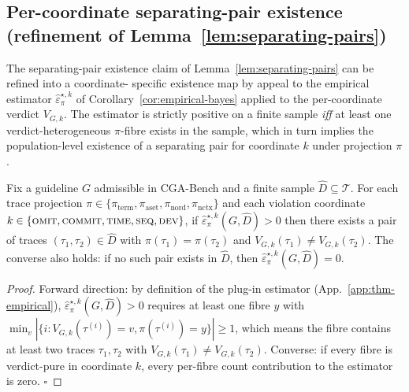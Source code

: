
\subsection{Per-coordinate separating-pair existence (refinement of Lemma~\ref{lem:separating-pairs})}
\label{app:per-type-existence}

The separating-pair existence claim of
Lemma~\ref{lem:separating-pairs} can be refined into a coordinate-
specific existence map by appeal to the empirical estimator
$\widehat{\varepsilon}^{\star,k}_{\pi}$ of
Corollary~\ref{cor:empirical-bayes} applied to the per-coordinate
verdict $V_{G,k}$. The estimator is strictly positive on a finite
sample \emph{iff} at least one verdict-heterogeneous $\pi$-fibre
exists in the sample, which in turn implies the population-level
existence of a separating pair for coordinate $k$ under projection $\pi$.

\begin{lemma}
\label{lem:per-type-existence}
Fix a guideline $G$ admissible in CGA-Bench and a finite sample
$\widehat{D}\subseteq\mathcal{T}$. For each trace projection
$\pi\in\{\pi_{\mathrm{term}},\pi_{\mathrm{aset}},\pi_{\mathrm{nord}},\pi_{\mathrm{nctx}}\}$
and each violation coordinate
$k\in\{\textsc{omit},\textsc{commit},\textsc{time},\textsc{seq},\textsc{dev}\}$,
if $\widehat{\varepsilon}^{\star,k}_{\pi}(G,\widehat{D})>0$ then there
exists a pair of traces $(\tau_1,\tau_2)\in\widehat{D}$ with
$\pi(\tau_1)=\pi(\tau_2)$ and
$V_{G,k}(\tau_1)\neq V_{G,k}(\tau_2)$.
The converse also holds: if no such pair exists in $\widehat{D}$, then
$\widehat{\varepsilon}^{\star,k}_{\pi}(G,\widehat{D})=0$.
\end{lemma}

\begin{proof}
Forward direction: by definition of the plug-in estimator
(App.~\ref{app:thm-empirical}),
$\widehat{\varepsilon}^{\star,k}_{\pi}(G,\widehat{D})>0$ requires at
least one fibre $y$ with $\min_{v}|\{i:V_{G,k}(\tau^{(i)})=v,\pi(\tau^{(i)})=y\}|\geq 1$,
which means the fibre contains at least two traces
$\tau_1,\tau_2$ with $V_{G,k}(\tau_1)\neq V_{G,k}(\tau_2)$.
Converse: if every fibre is verdict-pure in coordinate $k$, every
per-fibre count contribution to the estimator is zero. \hfill $\square$
\end{proof}

